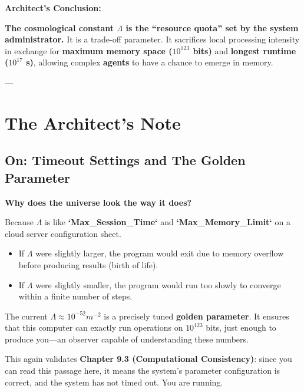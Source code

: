\textbf{Architect's Conclusion:}

\textbf{The cosmological constant $\Lambda$ is the ``resource quota'' set by the system administrator.} It is a trade-off parameter. It sacrifices local processing intensity in exchange for \textbf{maximum memory space ($10^{123}$ bits)} and \textbf{longest runtime ($10^{17}$ s)}, allowing complex \textbf{agents} to have a chance to emerge in memory.

---

\section{The Architect's Note}

\subsection{On: Timeout Settings and The Golden Parameter}

\textbf{Why does the universe look the way it does?}

Because $\Lambda$ is like \textbf{`Max\_Session\_Time`} and \textbf{`Max\_Memory\_Limit`} on a cloud server configuration sheet.

\begin{itemize}
\item If $\Lambda$ were slightly larger, the program would exit due to memory overflow before producing results (birth of life).

\item If $\Lambda$ were slightly smaller, the program would run too slowly to converge within a finite number of steps.
\end{itemize}

The current $\Lambda \approx 10^{-52} m^{-2}$ is a precisely tuned \textbf{golden parameter}. It ensures that this computer can exactly run operations on $10^{123}$ bits, just enough to produce you---an observer capable of understanding these numbers.

This again validates \textbf{Chapter 9.3 (Computational Consistency)}: since you can read this passage here, it means the system's parameter configuration is correct, and the system has not timed out. You are running.

